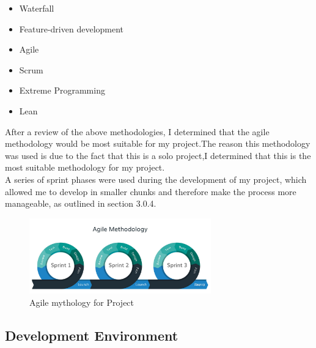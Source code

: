     \begin{itemize}
    
    \item Waterfall 
    \item Feature-driven development 
    \item Agile
    \item Scrum
    \item Extreme Programming
    \item Lean

    \end{itemize}
    
    After a review of the above methodologies, I determined that the agile methodology would be most
    suitable for my project.The reason this methodology was used is due to the fact that this is a solo project,I determined that this is the most suitable methodology for my project.\\
    
    A series of sprint  phases  were used during the development of my project, which allowed me to
    develop in smaller chunks and therefore make the process more manageable, as outlined in section 3.0.4.
    
    
    
    
    
    
    
    
    
    
    
    
    
    
    
    
    
    

       \begin{figure}[H]
  \centering
    \includegraphics[width=0.7\textwidth]{final-year-project-template-master/img/agileSprint.jpg}
     \caption{Agile mythology for Project }
\end{figure}

    \subsection{ Development Environment  }
    
